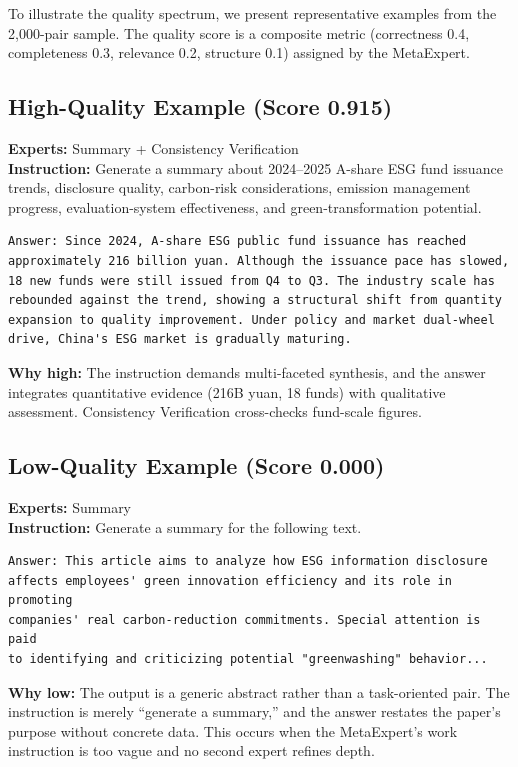 \documentclass[sigconf,nonacm]{acmart}
\begin{document}
To illustrate the quality spectrum, we present representative examples from the 2,000-pair sample. The quality score is a composite metric (correctness 0.4, completeness 0.3, relevance 0.2, structure 0.1) assigned by the MetaExpert.

\subsection{High-Quality Example (Score 0.915)}

\textbf{Experts:} Summary + Consistency Verification\\
\textbf{Instruction:} Generate a summary about 2024--2025 A-share ESG fund issuance trends, disclosure quality, carbon-risk considerations, emission management progress, evaluation-system effectiveness, and green-transformation potential.

\begin{lstlisting}
Answer: Since 2024, A-share ESG public fund issuance has reached
approximately 216 billion yuan. Although the issuance pace has slowed,
18 new funds were still issued from Q4 to Q3. The industry scale has
rebounded against the trend, showing a structural shift from quantity
expansion to quality improvement. Under policy and market dual-wheel
drive, China's ESG market is gradually maturing.
\end{lstlisting}

\noindent\textbf{Why high:} The instruction demands multi-faceted synthesis, and the answer integrates quantitative evidence (216B yuan, 18 funds) with qualitative assessment. Consistency Verification cross-checks fund-scale figures.

\subsection{Low-Quality Example (Score 0.000)}

\textbf{Experts:} Summary\\
\textbf{Instruction:} Generate a summary for the following text.

\begin{lstlisting}
Answer: This article aims to analyze how ESG information disclosure
affects employees' green innovation efficiency and its role in promoting
companies' real carbon-reduction commitments. Special attention is paid
to identifying and criticizing potential "greenwashing" behavior...
\end{lstlisting}

\noindent\textbf{Why low:} The output is a generic abstract rather than a task-oriented pair. The instruction is merely ``generate a summary,'' and the answer restates the paper's purpose without concrete data. This occurs when the MetaExpert's work instruction is too vague and no second expert refines depth.
\end{document}
